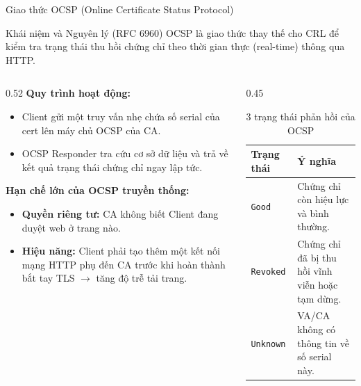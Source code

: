 \documentclass[10pt, aspectratio=169]{beamer}
\begin{document}
\begin{frame}{Giao thức OCSP (Online Certificate Status Protocol)}
    \begin{block}{Khái niệm và Nguyên lý (RFC 6960)}
        OCSP là giao thức thay thế cho CRL để kiểm tra trạng thái thu hồi chứng chỉ theo thời gian thực (real-time) thông qua HTTP.
    \end{block}
    \begin{columns}[onlytextwidth]
        \begin{column}{0.52\textwidth}
            \textbf{Quy trình hoạt động:}
            \begin{itemize}
                \item Client gửi một truy vấn nhẹ chứa số serial của cert lên máy chủ OCSP của CA.
                \item OCSP Responder tra cứu cơ sở dữ liệu và trả về kết quả trạng thái chứng chỉ ngay lập tức.
            \end{itemize}
            \vspace{0.1cm}
            \textbf{Hạn chế lớn của OCSP truyền thống:}
            \begin{itemize}
                \item \textbf{Quyền riêng tư:} CA không biết Client đang duyệt web ở trang nào.
                \item \textbf{Hiệu năng:} Client phải tạo thêm một kết nối mạng HTTP phụ đến CA trước khi hoàn thành bắt tay TLS $\rightarrow$ tăng độ trễ tải trang.
            \end{itemize}
        \end{column}
        \begin{column}{0.45\textwidth}
            \centering
            \begin{table}
                \centering
                \tiny
                \begin{tabular}{lp{3.5cm}}
                    \toprule
                    \textbf{Trạng thái} & \textbf{Ý nghĩa} \\
                    \midrule
                    \texttt{Good} & Chứng chỉ còn hiệu lực và bình thường. \\
                    \texttt{Revoked} & Chứng chỉ đã bị thu hồi vĩnh viễn hoặc tạm dừng. \\
                    \texttt{Unknown} & VA/CA không có thông tin về số serial này. \\
                    \bottomrule
                \end{tabular}
                \caption{3 trạng thái phản hồi của OCSP}
            \end{table}
        \end{column}
    \end{columns}
\end{frame}
\end{document}
